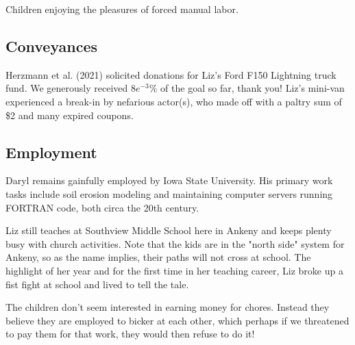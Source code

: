 \documentclass[letterpaper,11pt]{article}
\makeatletter
\newenvironment{figurehere}
  {\def\@captype{figure}}
  {}
\makeatother
\begin{document}
\begin{multicols}{2}
\begin{figurehere}
    \centering   
    \caption{Children enjoying the pleasures of forced manual labor.}
\end{figurehere}

\subsection{Conveyances}

Herzmann et al. (2021) solicited donations for Liz's Ford F150 Lightning truck fund.
We generously received $8e^{-3}\%$ of the goal so far, thank you!  Liz's mini-van
experienced a break-in by nefarious actor(s), who made off with a paltry sum of
\$2 and many expired coupons.

\bigskip

\subsection{Employment}

Daryl remains gainfully employed by Iowa State University.  His primary work
tasks include soil erosion modeling and maintaining computer servers
running FORTRAN code, both circa the 20th century.

Liz still teaches at Southview Middle School here in Ankeny and keeps plenty busy with
church activities.  Note that the kids are in the "north side" system for Ankeny,
so as the name implies, their paths will not cross at school.  The highlight of
her year and for the first time in her teaching career, Liz broke up a fist
fight at school and lived to tell the tale.

The children don't seem interested in earning money for chores.
Instead they believe they are employed to bicker at each other, which perhaps if
we threatened to pay them for that work, they would then refuse to do it!


\end{multicols}
\end{document}
